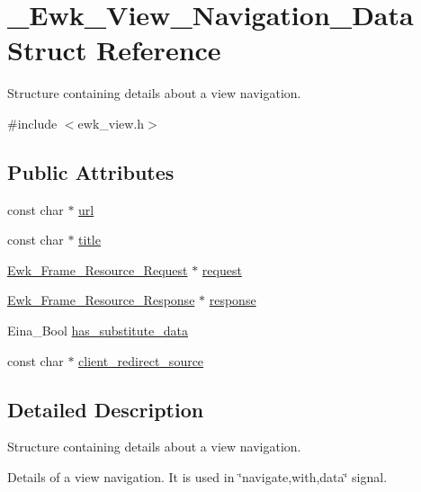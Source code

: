 \hypertarget{struct__Ewk__View__Navigation__Data}{\section{\+\_\+\+Ewk\+\_\+\+View\+\_\+\+Navigation\+\_\+\+Data Struct Reference}
\label{struct__Ewk__View__Navigation__Data}
}


Structure containing details about a view navigation.  




{\ttfamily \#include $<$ewk\+\_\+view.\+h$>$}

\subsection*{Public Attributes}
\begin{DoxyCompactItemize}
\item 
const char $\ast$ \hyperlink{struct__Ewk__View__Navigation__Data_a92f35de2b87fda899ae4df41fdc0b61c}{url}
\item 
const char $\ast$ \hyperlink{struct__Ewk__View__Navigation__Data_ad357114e7c98066aa62f552be9759c78}{title}
\item 
\hyperlink{ewk__frame_8h_acddf624050dec184d7071e77847d1d94}{Ewk\+\_\+\+Frame\+\_\+\+Resource\+\_\+\+Request} $\ast$ \hyperlink{struct__Ewk__View__Navigation__Data_af564e2362c466b045d90e36bc113213d}{request}
\item 
\hyperlink{ewk__frame_8h_a738f355baff59c9821ee7d962a2d4492}{Ewk\+\_\+\+Frame\+\_\+\+Resource\+\_\+\+Response} $\ast$ \hyperlink{struct__Ewk__View__Navigation__Data_aa05f408543da80e01d489f31aeb5f9d5}{response}
\item 
Eina\+\_\+\+Bool \hyperlink{struct__Ewk__View__Navigation__Data_a72ea978c47e1917d238fca470d6be736}{has\+\_\+substitute\+\_\+data}
\item 
const char $\ast$ \hyperlink{struct__Ewk__View__Navigation__Data_a3987d4ff73c8405ab9b8dd4fa04ee2d8}{client\+\_\+redirect\+\_\+source}
\end{DoxyCompactItemize}


\subsection{Detailed Description}
Structure containing details about a view navigation. 

Details of a view navigation. It is used in \char`\"{}navigate,with,data\char`\"{} signal. 

